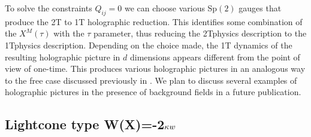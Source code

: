 \documentclass[a4paper,12pt]{article}
\begin{document}
To solve the constraints $Q_{ij}=0$ we can choose various Sp$\left( 2\right)
$ gauges that produce the 2T to 1T holographic reduction. This identifies
some combination of the $X^{M}\left( \tau \right) $ with the $\tau $
parameter, thus reducing the 2Tphysics description to the 1Tphysics
description. Depending on the choice made, the 1T dynamics of the resulting
holographic picture in $d$ dimensions appears different from the point of
view of one-time. This produces various holographic pictures in an analogous
way to the free case discussed previously in \cite{survey2T}. We plan to
discuss several examples of holographic pictures in the presence of
background fields in a future publication.

\subsection{Lightcone type W(X)=-2$\protect\kappa w$}
\end{document}
